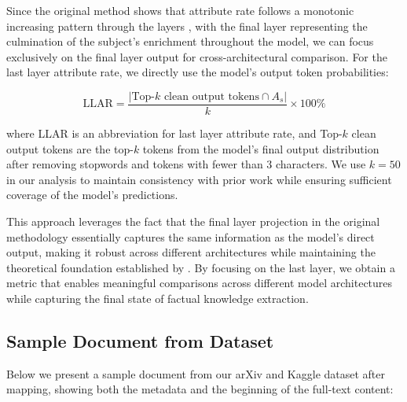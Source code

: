 \documentclass[10pt]{article}
\begin{document}
Since the original method shows that attribute rate follows a monotonic increasing pattern through the layers \citep{geva2023dissecting}, with the final layer representing the culmination of the subject's enrichment throughout the model, we can focus exclusively on the final layer output for cross-architectural comparison. For the last layer attribute rate, we directly use the model's output token probabilities:

\begin{equation}
\text{LLAR} = \frac{|\text{Top-}k \text{ clean output tokens} \cap A_s|}{k} \times 100\%
\end{equation}

where LLAR is an abbreviation for last layer attribute rate, and Top-$k$ clean output tokens are the top-$k$ tokens from the model's final output distribution after removing stopwords and tokens with fewer than 3 characters. We use $k=50$ in our analysis to maintain consistency with prior work while ensuring sufficient coverage of the model's predictions.

This approach leverages the fact that the final layer projection in the original methodology essentially captures the same information as the model's direct output, making it robust across different architectures while maintaining the theoretical foundation established by \citet{geva2023dissecting}. By focusing on the last layer, we obtain a metric that enables meaningful comparisons across different model architectures while capturing the final state of factual knowledge extraction.

\subsection{Sample Document from Dataset}
\label{subsec:sample-dataset}
Below we present a sample document from our arXiv and Kaggle dataset after mapping, showing both the metadata and the beginning of the full-text content:
\end{document}
